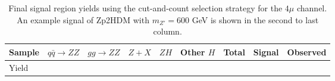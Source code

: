 \begin{table}[htbH]
\begin{center}
\begin{tabular}{ l | c | c | c | c | c | c | c | c }
\hline
\hline
Sample & $q\bar{q} \rightarrow ZZ$ & $gg \rightarrow ZZ$ & $Z+X$ & $ZH$ & Other $H$ & Total & Signal & Observed \\
\hline
Yield &  &  &  &  &  &  &  &  \\
\hline
\hline
\end{tabular}
\caption{Final signal region yields using the cut-and-count selection strategy for the $4\mu$ channel. An example signal of Zp2HDM with $m_{Z'}=600$ GeV is shown in the second to last column.}\label{tab:cacyields}
\end{center}
\end{table}






